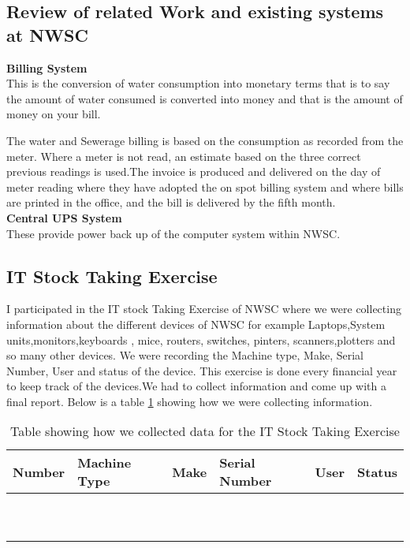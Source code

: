 \documentclass{article}
\begin{document}
\subsection{Review of related Work and existing systems at NWSC}
\textbf{Billing System}\\
This is the conversion of water consumption into monetary terms that is to say the amount of water consumed is converted into money and that is the amount of money on your bill.
\par  The water and Sewerage billing is based on the consumption as recorded from the meter. Where a meter is not read, an estimate based on the three correct previous readings is used.The invoice is produced and delivered on the day of meter reading where they have adopted the on spot billing system and where bills are printed in the office, and the bill is delivered by the fifth month.\\
\textbf{Central UPS System }\\
These provide power back up of the computer system within NWSC.
\subsection{IT Stock Taking Exercise}
I participated in the IT stock Taking Exercise of NWSC where we were collecting information about the different devices of NWSC for example Laptops,System units,monitors,keyboards , mice, routers, switches, pinters, scanners,plotters and so many other devices. We were recording the Machine type, Make, Serial Number, User and status of the device. This exercise is done every financial year to keep track of the devices.We had to collect information and come up with a final report. Below is a  table \ref{table:1} showing how we were collecting information.
\begin{table}[H]
\centering
\begin{tabu} to 0.8\textwidth { | X[c] | X[c] | X[c] | X[c] | X[c] | X[c] | }
 \hline
 Number &  Machine Type & Make &Serial Number &User &Status\\
 \hline
 &  & & & & \\
\hline
 &  & & & & \\
\hline
 &  & & & & \\
\hline
 &  & & & & \\
\hline
 &  & & & & \\
\hline
 &  & & & & \\
\hline
 &  & & & & \\
\hline
 &  & & & & \\
\hline
 &  & & & & \\
\hline
 &  & & & & \\
\hline
\end{tabu}
\caption{Table showing how we collected data for the  IT Stock Taking Exercise}
\label{table:1}
\end{table}
\end{document}
